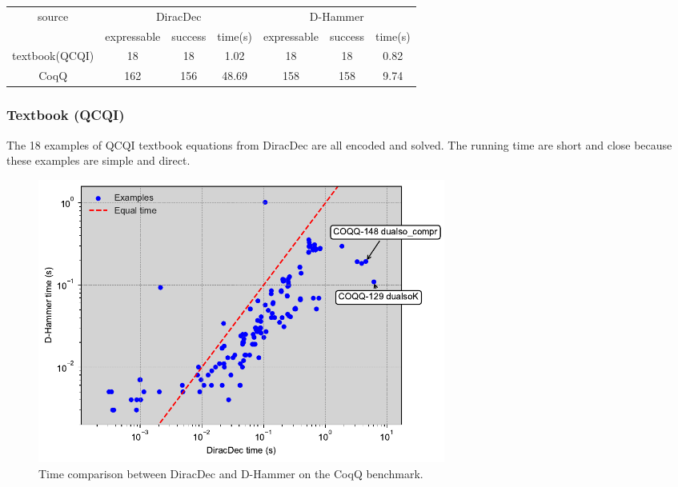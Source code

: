 \begin{center}
    \begin{tabular}{c|c c c|c c c}
        \hline
        \multirow{2}{*}{source} & \multicolumn{3}{c|}{DiracDec} & \multicolumn{3}{c}{D-Hammer} \\
        \cline{2-7}
                                 & expressable & success & time(s)           & expressable & success & time(s)                 \\
        \hline
        textbook(QCQI)          & 18          & 18        &    1.02        &    18      & 18          &   0.82      \\
        CoqQ                    & 162          & 156       &    48.69       &   158     &  158   &     9.74     \\
        \hline
    \end{tabular}        
\end{center}

\subsubsection{Textbook (QCQI)}
The 18 examples of QCQI textbook equations from DiracDec are all encoded and solved. The running time are short and close because these examples are simple and direct.


\begin{figure}
    \centering
    \includegraphics[width=0.65\textwidth]{fig/coqq.pdf}
    \caption{Time comparison between DiracDec and D-Hammer on the CoqQ benchmark.}
    \label{fig: CoqQ plot}
\end{figure}

